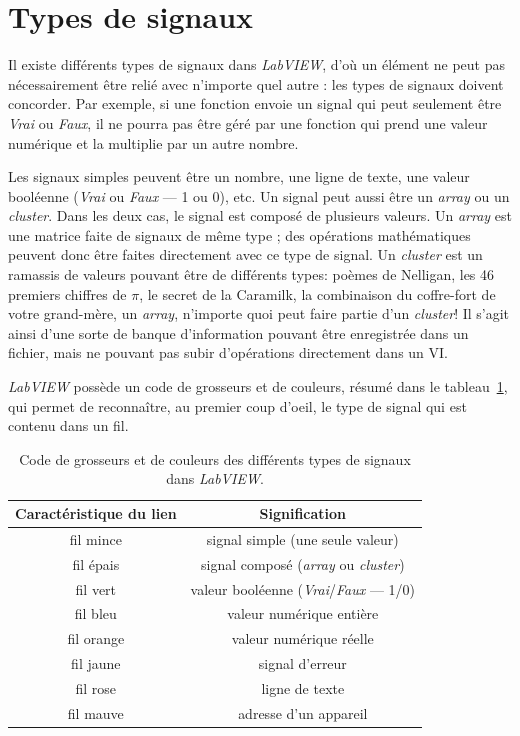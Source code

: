 \documentclass[12pt,oneside,letterpaper]{article}
\begin{document}
\section{Types de signaux}

Il existe différents types de signaux dans \textit{LabVIEW}, d'où un élément ne peut pas nécessairement être relié avec n'importe quel autre : les types de signaux doivent concorder. Par exemple, si une fonction envoie un signal qui peut seulement être \textit{Vrai} ou \textit{Faux}, il ne pourra pas être géré par une fonction qui prend une valeur numérique et la multiplie par un autre nombre.

Les signaux simples peuvent être un nombre, une ligne de texte, une valeur booléenne (\textit{Vrai} ou \textit{Faux} --- 1 ou 0), etc. Un signal peut aussi être un \textit{array} ou un \textit{cluster}. Dans les deux cas, le signal est composé de plusieurs valeurs. Un \textit{array} est une matrice faite de signaux de même type ; des opérations mathématiques peuvent donc être faites directement avec ce type de signal. Un \textit{cluster} est un ramassis de valeurs pouvant être de différents types: poèmes de Nelligan, les 46 premiers chiffres de $\pi$, le secret de la Caramilk, la combinaison du coffre-fort de votre grand-mère, un \textit{array}, n'importe quoi peut faire partie d'un \textit{cluster}! Il s'agit ainsi d'une sorte de banque d'information pouvant être enregistrée dans un fichier, mais ne pouvant pas subir d'opérations directement dans un VI.

\textit{LabVIEW} possède un code de grosseurs et de couleurs, résumé dans le tableau~\ref{tab-types-signaux}, qui permet de reconnaître, au premier coup d'oeil, le type de signal qui est contenu dans un fil.

\begin{table}[h]
\begin{center}
\begin{tabular}{|c|c|}
\hline
\textbf{Caractéristique du lien} & \textbf{Signification} \\
\hline
fil mince & signal simple (une seule valeur) \\
\hline
fil épais & signal composé (\textit{array} ou \textit{cluster}) \\
\hline
fil vert & valeur booléenne (\textit{Vrai}/\textit{Faux} --- 1/0) \\
\hline
fil bleu & valeur numérique entière \\
\hline
fil orange & valeur numérique réelle \\
\hline
fil jaune & signal d'erreur \\
\hline
fil rose & ligne de texte \\
\hline
fil mauve & adresse d'un appareil \\
\hline
\end{tabular}
\end{center}
\caption{\label{tab-types-signaux}Code de grosseurs et de couleurs des différents types de signaux dans \textit{LabVIEW}.}
\end{table}
\end{document}
